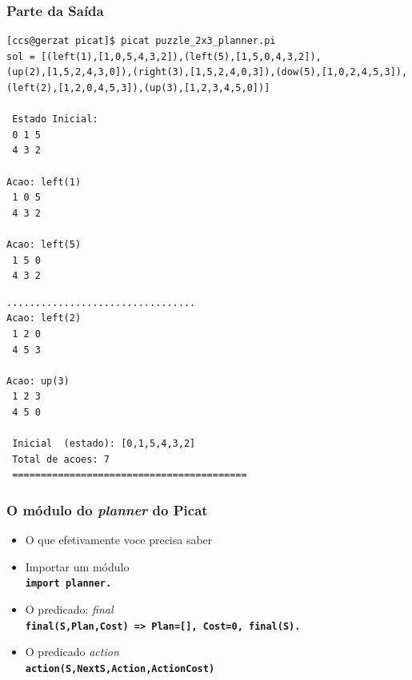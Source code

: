 \begin{frame}[fragile, allowframebreaks=0.9]
 \frametitle{Parte da Saída}

\begin{footnotesize}
\begin{verbatim}
[ccs@gerzat picat]$ picat puzzle_2x3_planner.pi 
sol = [(left(1),[1,0,5,4,3,2]),(left(5),[1,5,0,4,3,2]),
(up(2),[1,5,2,4,3,0]),(right(3),[1,5,2,4,0,3]),(dow(5),[1,0,2,4,5,3]),
(left(2),[1,2,0,4,5,3]),(up(3),[1,2,3,4,5,0])]

 Estado Inicial: 
 0 1 5
 4 3 2

Acao: left(1)
 1 0 5
 4 3 2

Acao: left(5)
 1 5 0
 4 3 2
\end{verbatim}
\end{footnotesize}

\framebreak
\begin{footnotesize}
\begin{verbatim}
.................................
Acao: left(2)
 1 2 0
 4 5 3

Acao: up(3)
 1 2 3
 4 5 0

 Inicial  (estado): [0,1,5,4,3,2] 
 Total de acoes: 7 
 =========================================
\end{verbatim}
\end{footnotesize}

\end{frame}



\begin{frame}[fragile]
 \frametitle{O módulo do \textit{planner} do Picat}

\begin{itemize}
  \item O que efetivamente voce precisa saber
  
  \pause
  \item Importar um módulo \\
   \textbf{\texttt{import planner.}}

   \pause
   \item O predicado: \textit{final}\\
    \textbf{\texttt{final(S,Plan,Cost) => Plan=[], Cost=0, final(S).}}
   
    \pause
    \item O predicado \textit{action}\\
    \textbf{\texttt{action(S,NextS,Action,ActionCost)}}

\end{itemize}
\end{frame}


